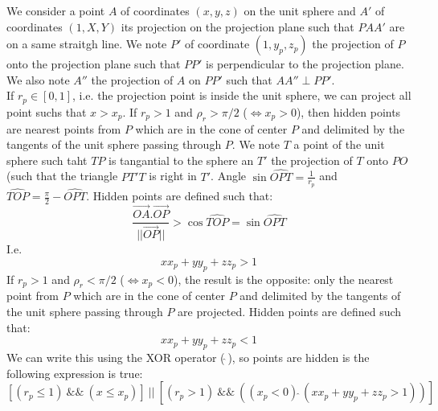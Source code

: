   We consider a point $A$ of coordinates $(x, y, z)$ on the unit sphere
  and $A'$ of coordinates $(1, X, Y)$ its projection on the projection plane such that $PAA'$ are on a same straitgh line.
  We note $P'$ of coordinate $(1, y_p, z_p)$ the projection of $P$ onto the projection plane such that $PP'$ is perpendicular to the projection plane.
  We also note $A''$ the projection of $A$ on $PP'$ such that $AA''\perp PP'$.\\
  If $r_p \in [0, 1]$, i.e. the projection point is inside the unit sphere, we can project all point suchs that $x > x_p$.
  If $r_p > 1$ and $\rho_r > \pi / 2$ ($\Leftrightarrow x_p >0$), then hidden points are nearest points from $P$ which are in the cone of center $P$ and delimited by
  the tangents of the unit sphere passing through $P$. We note $T$ a point  of the unit sphere such taht $TP$ is tangantial to the sphere
  an $T'$ the projection of $T$ onto $PO$ (such that the triangle $PT'T$ is right in $T'$.
  Angle $\sin\widehat{OPT} = \frac{1}{r_p}$ and $\widehat{TOP}=\frac{\pi}{2} - \widehat{OPT}$.
  Hidden points are defined such that:
  \begin{equation*}
    \frac{\vec{OA}.\vec{OP}}{||\vec{OP}||} > \cos\widehat{TOP} = \sin\widehat{OPT}
  \end{equation*}
  I.e.
  \begin{equation}
    xx_p + yy_p + zz_p > 1 \label{eq:szp:proj:bounds1}
  \end{equation}
  If $r_p > 1$ and $\rho_r < \pi / 2$ ($\Leftrightarrow x_p <0$), the result is the opposite: only the nearest point
  from $P$ which are in the cone of center $P$ and delimited by
  the tangents of the unit sphere passing through $P$ are projected.
  Hidden points are defined such that:
  \begin{equation}
    xx_p + yy_p + zz_p < 1 \label{eq:szp:proj:bounds2}
  \end{equation}
  We can write this using the XOR operator ($\hat{\;}$), so points are hidden is the following expression is true:
  \begin{equation*}
    \left[(r_p \le 1)\:\&\&\:(x \le x_p)\right]\:||\:\left[(r_p > 1)\:\&\&\:\left( (x_p < 0) \hat{\;} (xx_p + yy_p + zz_p > 1)\right)\right] 
  \end{equation*}

